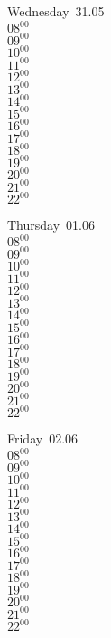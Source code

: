 \documentclass[11pt,a4paper]{book}\usepackage[]{graphicx}\usepackage[]{color}
\begin{document}
\begin{weekdaybox}
  Wednesday~31.05\\
  { 
  \vfill
  $08^{00}$\\
$09^{00}$\\
$10^{00}$\\
$11^{00}$\\
$12^{00}$\\
$13^{00}$\\
$14^{00}$\\
$15^{00}$\\
$16^{00}$\\
$17^{00}$\\
$18^{00}$\\
$19^{00}$\\
$20^{00}$\\
$21^{00}$\\
$22^{00}$\\
  }
\end{weekdaybox}
\clearpage
\begin{headerbox}
\end{headerbox}
\begin{weekdaybox}
  Thursday~01.06\\
  { 
  \vfill
  $08^{00}$\\
$09^{00}$\\
$10^{00}$\\
$11^{00}$\\
$12^{00}$\\
$13^{00}$\\
$14^{00}$\\
$15^{00}$\\
$16^{00}$\\
$17^{00}$\\
$18^{00}$\\
$19^{00}$\\
$20^{00}$\\
$21^{00}$\\
$22^{00}$\\
  }
\end{weekdaybox} 
\begin{weekdaybox}
  Friday~02.06\\
  { 
  \vfill
  $08^{00}$\\
$09^{00}$\\
$10^{00}$\\
$11^{00}$\\
$12^{00}$\\
$13^{00}$\\
$14^{00}$\\
$15^{00}$\\
$16^{00}$\\
$17^{00}$\\
$18^{00}$\\
$19^{00}$\\
$20^{00}$\\
$21^{00}$\\
$22^{00}$\\
  }
\end{weekdaybox}
\end{document}
